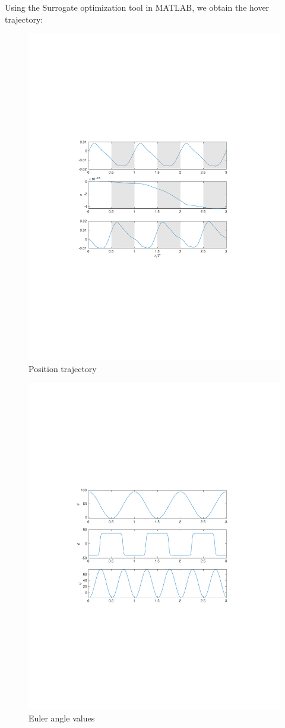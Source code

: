 \documentclass[10pt]{article}
\begin{document}
Using the Surrogate optimization tool in MATLAB, we obtain the hover trajectory:
\begin{figure}[h!]
	\centering
	\includegraphics[width=0.75\linewidth]{sim_QS_x_hover_pos.pdf}
	\caption{Position trajectory}
\end{figure}

\begin{figure}[h!]
	\centering
	\includegraphics[width=0.75\linewidth]{sim_QS_x_hover_kin.pdf}
	\caption{Euler angle values}
\end{figure}
\end{document}
